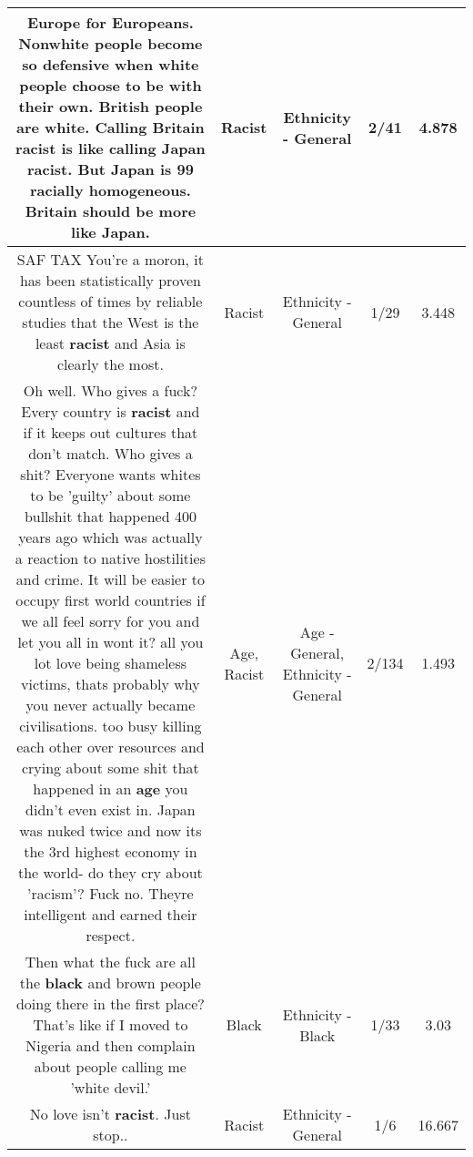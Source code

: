 \documentclass[11pt]{article}
\newlength\mylength
\begin{document}
\begin{center}
\begin{longtable}{|C{.65\mylength}|C{.30\mylength}|C{.12\mylength}|C{.12\mylength}|C{.12\mylength}|}
  \small Europe for Europeans. Nonwhite people become so defensive when white people choose to be with their own. British people are white. Calling Britain \textbf{racist} is like calling Japan \textbf{racist}. But Japan is 99 racially homogeneous. Britain should be more like Japan.\normalsize   & Racist & Ethnicity - General & 2/41 & 4.878 \\  \hline
  \small SAF TAX You're a moron, it has been statistically proven countless of times by reliable studies that the West is the least \textbf{racist} and Asia is clearly the most.\normalsize   & Racist & Ethnicity - General & 1/29 & 3.448 \\  \hline
  \small Oh well. Who gives a fuck? Every country is \textbf{racist} and if it keeps out cultures that don't match. Who gives a shit? Everyone wants whites to be 'guilty' about some bullshit that happened 400 years ago which was actually a reaction to native hostilities and crime. It will be easier to occupy first world countries if we all feel sorry for you and let you all in wont it? all you lot love being shameless victims, thats probably why you never actually became civilisations. too busy killing each other over resources and crying about some shit that happened in an \textbf{age} you didn't even exist in. Japan was nuked twice and now its the 3rd highest economy in the world- do they cry about 'racism'? Fuck no. Theyre intelligent and earned their respect.\normalsize   & Age, Racist & Age - General, Ethnicity - General & 2/134 & 1.493 \\  \hline
  \small Then what the fuck are all the \textbf{black} and brown people doing there in the first place? That's like if I moved to Nigeria and then complain about people calling me 'white devil.'\normalsize   & Black & Ethnicity - Black & 1/33 & 3.03 \\  \hline
  \small No love isn't \textbf{racist}. Just stop..\normalsize   & Racist & Ethnicity - General & 1/6 & 16.667 \\  \hline

\end{longtable}
\end{center}
\end{document}
